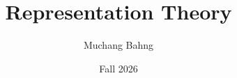 \documentclass{article}
\begin{document}
\title{Representation Theory}
\author{Muchang Bahng}
\date{Fall 2026}

\maketitle
\tableofcontents
\pagebreak 






\end{document}
